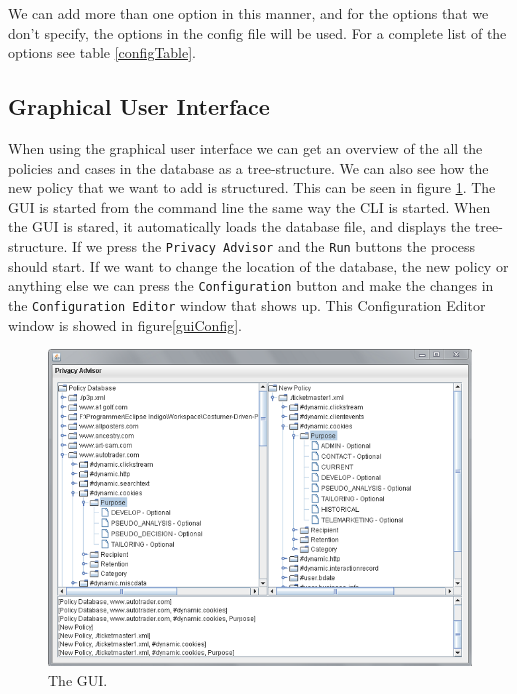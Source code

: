 We can add more than one option in this manner, and for the options that we don't specify, the options in the config file will be used. For a complete list of the options see table \ref{configTable}.

\subsection{Graphical User Interface}
When using the graphical user interface we can get an overview of the all the policies and cases in the database as a tree-structure. We can also see how the new policy that we want to add is structured. This can be seen in figure \ref{guiFigure}. The GUI is started from the command line the same way the CLI is started. When the GUI is stared, it automatically loads the database file, and displays the tree-structure. If we press the \texttt{Privacy Advisor} and  the \texttt{Run} buttons the process should start. If we want to change the location of the database, the new policy or anything else we can press the \texttt{Configuration} button and make the changes in the \texttt{Configuration Editor} window that shows up. This Configuration Editor window is showed in figure\ref{guiConfig}.

\begin{centering}
  \begin{figure}
    \includegraphics{Documentation/gui.png}
    \caption{The GUI.}
    \label{guiFigure}
  \end{figure}
\end{centering}

